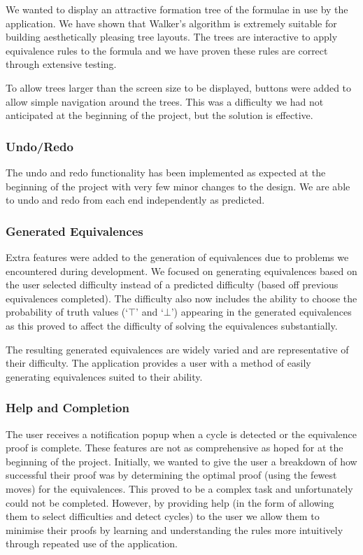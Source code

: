 \documentclass{report}
\begin{document}
We wanted to display an attractive formation tree of the formulae in use by the application. We have shown that Walker's algorithm is extremely suitable for building aesthetically pleasing tree layouts. The trees are interactive to apply equivalence rules to the formula and we have proven these rules are correct through extensive testing. 

To allow trees larger than the screen size to be displayed, buttons were added to allow simple navigation around the trees. This was a difficulty we had not anticipated at the beginning of the project, but the solution is effective.

\subsubsection{Undo/Redo}

The undo and redo functionality has been implemented as expected at the beginning of the project with very few minor changes to the design. We are able to undo and redo from each end independently as predicted.

\subsubsection{Generated Equivalences}

Extra features were added to the generation of equivalences due to problems we encountered during development. We focused on generating equivalences based on the user selected difficulty instead of a predicted difficulty (based off previous equivalences completed). The difficulty also now includes the ability to choose the probability of truth values (`$\top$' and `$\bot$') appearing in the generated equivalences as this proved to affect the difficulty of solving the equivalences substantially.

The resulting generated equivalences are widely varied and are representative of their difficulty. The application provides a user with a method of easily generating equivalences suited to their ability.

\subsubsection{Help and Completion}

The user receives a notification popup when a cycle is detected or the equivalence proof is complete. These features are not as comprehensive as hoped for at the beginning of the project. Initially, we wanted to give the user a breakdown of how successful their proof was by determining the optimal proof (using the fewest moves) for the equivalences. This proved to be a complex task and unfortunately could not be completed. However, by providing help (in the form of allowing them to select difficulties and detect cycles) to the user we allow them to minimise their proofs by learning and understanding the rules more intuitively through repeated use of the application.
\end{document}

